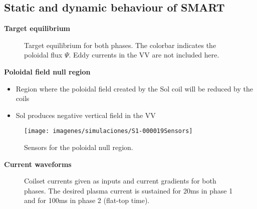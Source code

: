 \documentclass[10pt]{beamer}
\begin{document}
	\subsection{Static and dynamic behaviour of SMART}

\begin{frame}{\bf Target equilibrium}
	\begin{figure}[htbp]
	\centering
	\hfill
	\caption{Target equilibrium for both phases. The colorbar indicates the poloidal flux $\Psi$. Eddy currents in the VV are not included here.}
	\end{figure} %
\end{frame}


\begin{frame}{\bf Poloidal field null region}
	\begin{minipage}{0.45\textwidth}
		\begin{itemize}
			\item Region where the poloidal field created by the Sol coil will be reduced by the coils
			\item Sol produces negative vertical field in the VV
		\end{itemize}
	\end{minipage}
	\hfill
	\begin{minipage}{0.45\textwidth}
		\begin{figure}[t]
			\centering
			\texttt{[image: imagenes/simulaciones/S1-000019Sensors]}
			\caption{Sensors for the poloidal null region.}
		\end{figure}
	\end{minipage}
\end{frame}

\begin{frame}{\bf Current waveforms}
	\begin{figure}[h!]
	\centering
	\hfill
	\caption{Coilset currents given as inputs and current gradients for both phases. The desired plasma current is sustained for 20ms in phase 1 and for 100ms in phase 2 (flat-top time).}
	\end{figure}
\end{frame}
\end{document}
